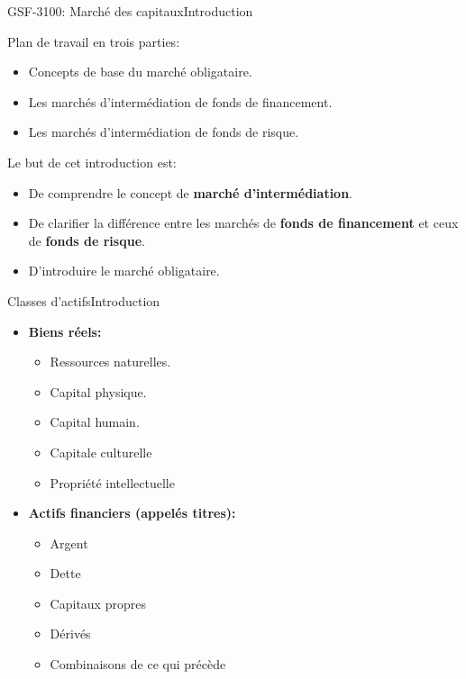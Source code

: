\documentclass{beamer}
\begin{document}
\begin{frame}{GSF-3100: Marché des capitaux}{Introduction}
  \begin{block}{Plan de travail en trois parties:}
\begin{itemize}
\item Concepts de base du marché obligataire.
\item Les marchés d'intermédiation de fonds de financement.
\item Les marchés d’intermédiation de fonds de risque.
\end{itemize}
  \end{block}
  
  \begin{block}{Le but de cet introduction est:}
\begin{itemize}
\item De comprendre le concept de \textbf{marché d’intermédiation}.
\item De clarifier la différence entre les marchés de \textbf{fonds de financement} et ceux de \textbf{fonds de risque}.
\item D’introduire le marché obligataire.
\end{itemize}
  \end{block}
\end{frame}

\begin{frame}{Classes d'actifs}{Introduction}
\begin{itemize}
\item \textbf{Biens réels:}
\begin{itemize}
\item Ressources naturelles.
\item Capital physique.
\item Capital humain.
\item Capitale culturelle
\item Propriété intellectuelle
\end{itemize}
\item \textbf{Actifs financiers (appelés titres):}
\begin{itemize}
\item Argent
\item Dette
\item Capitaux propres
\item Dérivés
\item Combinaisons de ce qui précède
\end{itemize}
\end{itemize}
\end{frame}
\end{document}
